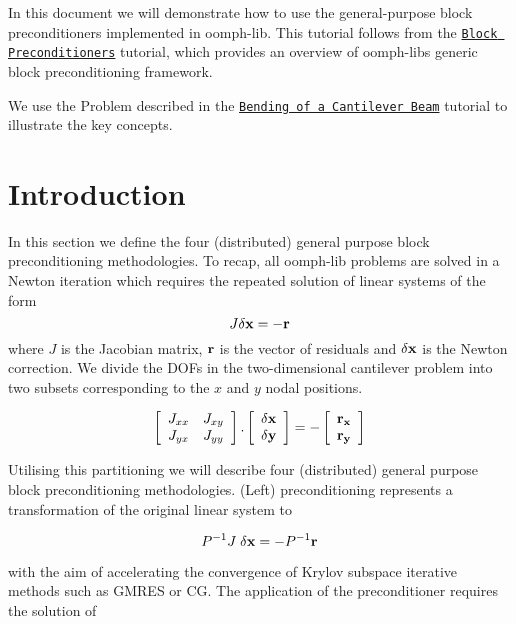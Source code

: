 In this document we will demonstrate how to use the general-\/purpose block preconditioners implemented in {\ttfamily oomph-\/lib}. This tutorial follows from the \href{../../../mpi/block_preconditioners/html/index.html}{\tt Block Preconditioners} tutorial, which provides an overview of {\ttfamily oomph-\/lib\textquotesingle{}s} generic block preconditioning framework.

We use the {\ttfamily Problem} described in the \href{../../../solid/airy_cantilever/html/index.html}{\tt Bending of a Cantilever Beam} tutorial to illustrate the key concepts.\hypertarget{index_introduction}{}\section{Introduction}\label{index_introduction}
In this section we define the four (distributed) general purpose block preconditioning methodologies. To recap, all {\ttfamily oomph-\/lib} problems are solved in a Newton iteration which requires the repeated solution of linear systems of the form \[ J\delta {\bf x}=-{\bf r} \] where $J$ is the Jacobian matrix, $\bf r$ is the vector of residuals and $\bf \delta x$ is the Newton correction. We divide the D\+O\+Fs in the two-\/dimensional cantilever problem into two subsets corresponding to the $x$ and $y$ nodal positions.

\[ \left[ \begin{array}{cc} J_{xx}&J_{xy}\\ J_{yx}&J_{yy} \end{array} \right]. \left[ \begin{array}{c} \bf \delta x \\ \bf \delta y \\ \end{array} \right] = -\left[ \begin{array}{c} \bf r_x \\ \bf r_y \\ \end{array} \right] \]

Utilising this partitioning we will describe four (distributed) general purpose block preconditioning methodologies. (Left) preconditioning represents a transformation of the original linear system to

\[ P^{-1}J\;{\bf \delta x}=-P^{-1}{\bf r} \]

with the aim of accelerating the convergence of Krylov subspace iterative methods such as G\+M\+R\+ES or CG. The application of the preconditioner requires the solution of

